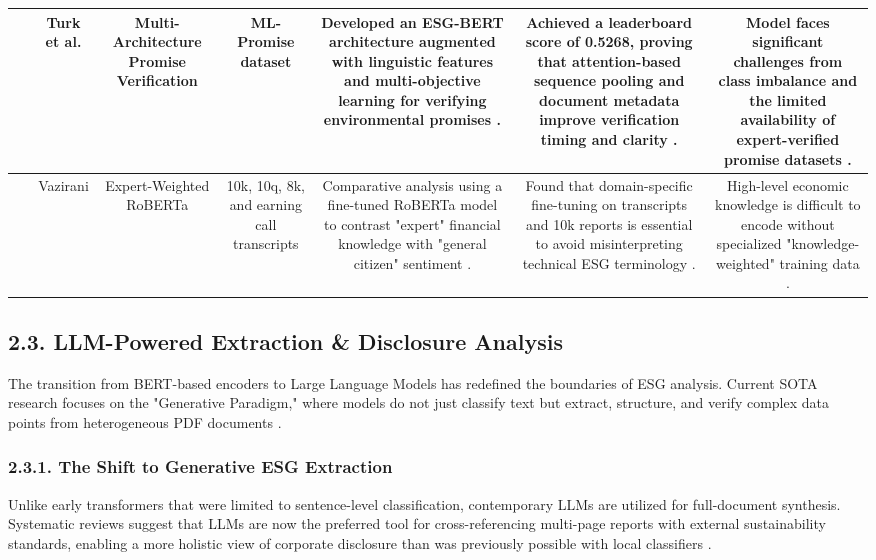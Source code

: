 \documentclass{article}
\begin{document}
\begin{table}[h!]
\begin{tabular}{|c|c|c|c|c|c|c|}
~ & Turk et al.  \parencite{nawar_turk_b0db88fd} & Multi-Architecture Promise Verification & ML-Promise dataset  \parencite{nawar_turk_b0db88fd} & Developed an ESG-BERT architecture augmented with linguistic features and multi-objective learning for verifying environmental promises  \parencite{nawar_turk_b0db88fd}. & Achieved a leaderboard score of 0.5268, proving that attention-based sequence pooling and document metadata improve verification timing and clarity  \parencite{nawar_turk_b0db88fd}. & Model faces significant challenges from class imbalance and the limited availability of expert-verified promise datasets  \parencite{nawar_turk_b0db88fd}. \\ \hline
~ & Vazirani  \parencite{krish_vazirani_54d9465b} & Expert-Weighted RoBERTa & 10k, 10q, 8k, and earning call transcripts  \parencite{krish_vazirani_54d9465b} & Comparative analysis using a fine-tuned RoBERTa model to contrast "expert" financial knowledge with "general citizen" sentiment  \parencite{krish_vazirani_54d9465b}. & Found that domain-specific fine-tuning on transcripts and 10k reports is essential to avoid misinterpreting technical ESG terminology  \parencite{krish_vazirani_54d9465b}. & High-level economic knowledge is difficult to encode without specialized "knowledge-weighted" training data  \parencite{krish_vazirani_54d9465b}. \\ \hline
\end{tabular}
\end{table}
\subsection*{2.3. LLM-Powered Extraction \& Disclosure Analysis}

The transition from BERT-based encoders to Large Language Models has redefined the boundaries of ESG analysis. Current SOTA research focuses on the "Generative Paradigm," where models do not just classify text but extract, structure, and verify complex data points from heterogeneous PDF documents  \parencite{seyed_alireza_mousavian_anaraki_b56a1c0f}.
\subsubsection*{2.3.1. The Shift to Generative ESG Extraction}

Unlike early transformers that were limited to sentence-level classification, contemporary LLMs are utilized for full-document synthesis. Systematic reviews suggest that LLMs are now the preferred tool for cross-referencing multi-page reports with external sustainability standards, enabling a more holistic view of corporate disclosure than was previously possible with local classifiers  \parencite{seyed_alireza_mousavian_anaraki_b56a1c0f}.
\end{document}
